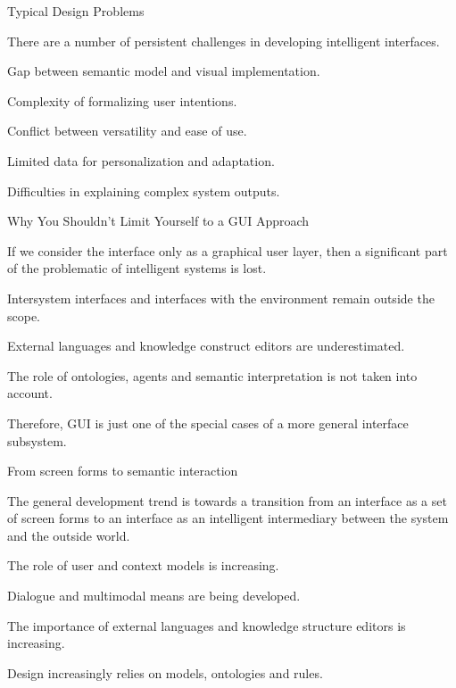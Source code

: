 \begin{frame}{Typical Design Problems}
	\topline
	\justifying
	
	There are a number of persistent challenges in developing intelligent interfaces.
	
	\begin{textitemize}
		\item Gap between semantic model and visual implementation.
		\item Complexity of formalizing user intentions.
		\item Conflict between versatility and ease of use.
		\item Limited data for personalization and adaptation.
		\item Difficulties in explaining complex system outputs.
	\end{textitemize}
\end{frame}

\begin{frame}{Why You Shouldn't Limit Yourself to a GUI Approach}
	\topline
	\justifying
	
	If we consider the interface only as a graphical user layer, then a significant part of the problematic of intelligent systems is lost.
	
	\begin{textitemize}
		\item Intersystem interfaces and interfaces with the environment remain outside the scope.
		\item External languages and knowledge construct editors are underestimated.
		\item The role of ontologies, agents and semantic interpretation is not taken into account.
		\item Therefore, GUI is just one of the special cases of a more general interface subsystem.
	\end{textitemize}
\end{frame}

\begin{frame}{From screen forms to semantic interaction}
	\topline
	\justifying
	
	The general development trend is towards a transition from an interface as a set of screen forms to an interface as an intelligent intermediary between the system and the outside world.
	
	\begin{textitemize}
		\item The role of user and context models is increasing.
		\item Dialogue and multimodal means are being developed.
		\item The importance of external languages and knowledge structure editors is increasing.
		\item Design increasingly relies on models, ontologies and rules.
	\end{textitemize}
\end{frame}

